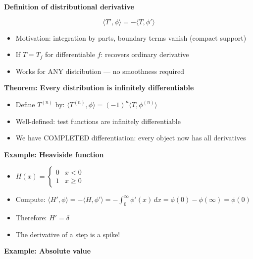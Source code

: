 \documentclass[
  10pt,
  letterpaper,
]{scrbook}
\providecommand{\tightlist}{%
  \setlength{\itemsep}{0pt}\setlength{\parskip}{0pt}}
\begin{document}
\textbf{Definition of distributional derivative}

\[\langle T', \phi \rangle = -\langle T, \phi' \rangle\]

\begin{itemize}
\tightlist
\item
  Motivation: integration by parts, boundary terms vanish (compact
  support)
\item
  If \(T = T_f\) for differentiable \(f\): recovers ordinary derivative
\item
  Works for ANY distribution --- no smoothness required
\end{itemize}

\textbf{Theorem: Every distribution is infinitely differentiable}

\begin{itemize}
\tightlist
\item
  Define \(T^{(n)}\) by:
  \(\langle T^{(n)}, \phi \rangle = (-1)^n \langle T, \phi^{(n)} \rangle\)
\item
  Well-defined: test functions are infinitely differentiable
\item
  We have COMPLETED differentiation: every object now has all
  derivatives
\end{itemize}

\textbf{Example: Heaviside function}

\begin{itemize}
\tightlist
\item
  \(H(x) = \begin{cases} 0 & x < 0 \\ 1 & x \geq 0 \end{cases}\)
\item
  Compute:
  \(\langle H', \phi \rangle = -\langle H, \phi' \rangle = -\int_0^\infty \phi'(x)\, dx = \phi(0) - \phi(\infty) = \phi(0)\)
\item
  Therefore: \(H' = \delta\)
\item
  The derivative of a step is a spike!
\end{itemize}

\textbf{Example: Absolute value}
\end{document}
